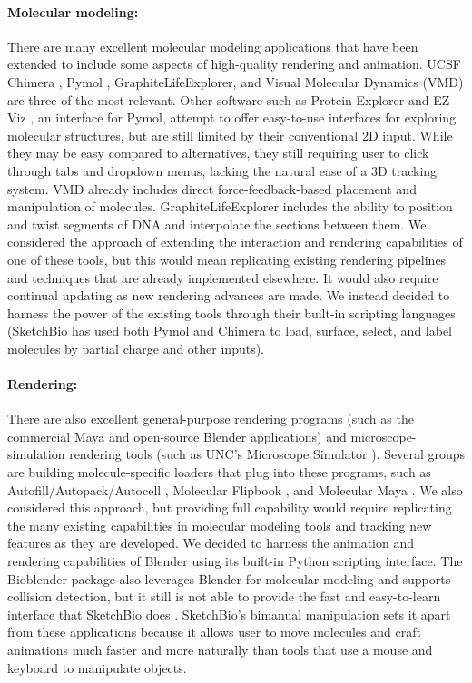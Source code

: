 \documentclass[twocolumn]{bmcart}%
\begin{document}
\paragraph*{Molecular modeling:}
There are many excellent molecular modeling applications that have been extended to include some aspects of high-quality rendering and animation.
UCSF Chimera \cite{pettersen2004ucsf}, Pymol \cite{pymol2013}, GraphiteLifeExplorer\cite{hornus2013easy}, and Visual Molecular Dynamics (VMD) \cite{humphrey1996} are three of the most relevant.
Other software such as Protein Explorer \cite{martz2002protein} and EZ-Viz \cite{grell2006ez}, an interface for Pymol, attempt to offer easy-to-use interfaces for exploring molecular structures, but are still limited by their conventional 2D input.
While they may be easy compared to alternatives, they still requiring user to click through tabs and dropdown menus, lacking the natural ease of a 3D tracking system.
VMD already includes direct force-feedback-based placement and manipulation of molecules.
GraphiteLifeExplorer includes the ability to position and twist segments of DNA and interpolate  the sections between them.
We considered the approach of extending the interaction and rendering capabilities of one of these tools, but this would mean replicating existing rendering pipelines and techniques that are already implemented elsewhere.
It would also require continual updating as new rendering advances are made.
We instead decided to harness the power of the existing tools through their built-in scripting languages (SketchBio has used both Pymol and Chimera to load, surface, select, and label molecules by partial charge and other inputs).

\paragraph*{Rendering:}
There are also excellent general-purpose rendering programs (such as the commercial Maya and open-source Blender applications) and microscope-simulation rendering tools (such as UNC's Microscope Simulator \cite{quammen2008}).
Several groups are building molecule-specific loaders that plug into these programs, such as Autofill/Autopack/Autocell \cite{Johnson2013}, Molecular Flipbook \cite{flipbook2013}, and Molecular Maya \cite{molecularmaya}.
We also considered this approach, but providing full capability would require replicating the many existing capabilities in molecular modeling tools and tracking new features as they are developed.
We decided to harness the animation and rendering capabilities of Blender using its built-in Python scripting interface.
The Bioblender package also leverages Blender for molecular modeling and supports collision detection, but it still is not able to provide the fast and easy-to-learn interface that SketchBio does \cite{zini2010bioblender}.
SketchBio's bimanual manipulation sets it apart from these applications because it allows user to move molecules and craft animations much faster and more naturally than tools that use a mouse and keyboard to manipulate objects.
\end{document}
